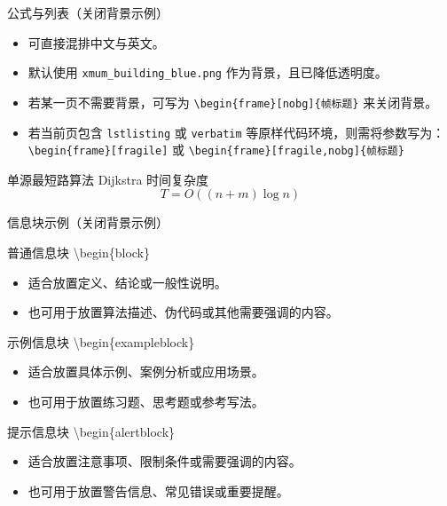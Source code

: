 \documentclass[aspectratio=169,11pt]{ctexbeamer}
\begin{document}
\begin{frame}[nobg]{公式与列表（关闭背景示例）}
    \begin{itemize}
        \item 可直接混排中文与英文。
        \item 默认使用 \texttt{xmum\_building\_blue.png} 作为背景，且已降低透明度。
        \item 若某一页不需要背景，可写为 \texttt{\textbackslash begin\{frame\}[nobg]\{帧标题\}} 来关闭背景。
        \item 若当前页包含 \texttt{lstlisting} 或 \texttt{verbatim} 等原样代码环境，则需将参数写为：\texttt{\textbackslash begin\{frame\}[fragile]} 或 \texttt{\textbackslash begin\{frame\}[fragile,nobg]\{帧标题\}}
    \end{itemize}

    \begin{block}{单源最短路算法 Dijkstra 时间复杂度}
        \[
            T = O((n + m)\log n)
        \]
    \end{block}
\end{frame}

\begin{frame}[nobg]{信息块示例（关闭背景示例）}
    \vspace{-4pt}
    \begin{block}{普通信息块 \textbackslash begin\{block\}}
        \begin{itemize}
            \item 适合放置定义、结论或一般性说明。
            \item 也可用于放置算法描述、伪代码或其他需要强调的内容。
        \end{itemize}
    \end{block}
    \vspace{-4pt}
    \begin{exampleblock}{示例信息块 \textbackslash begin\{exampleblock\}}
        \begin{itemize}
            \item 适合放置具体示例、案例分析或应用场景。
            \item 也可用于放置练习题、思考题或参考写法。
        \end{itemize}
    \end{exampleblock}
    \vspace{-4pt}
    \begin{alertblock}{提示信息块 \textbackslash begin\{alertblock\}}
        \begin{itemize}
            \item 适合放置注意事项、限制条件或需要强调的内容。
            \item 也可用于放置警告信息、常见错误或重要提醒。
        \end{itemize}
    \end{alertblock}
\end{frame}
\end{document}
